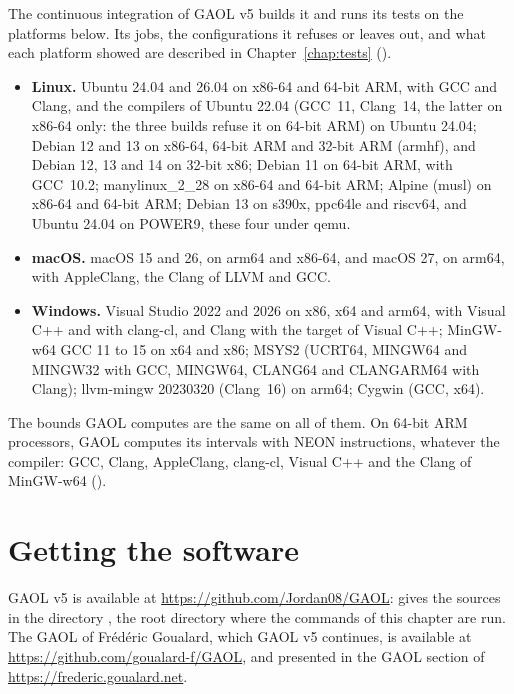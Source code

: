The continuous integration of GAOL v5 builds it and runs its tests on the
platforms below. Its jobs, the configurations it refuses or leaves out, and
what each platform showed are described in Chapter~\ref{chap:tests}
().

\begin{itemize}
\item[$\bullet$] \textbf{Linux.} Ubuntu 24.04 and 26.04 on x86-64 and
  64-bit ARM, with GCC and Clang, and the compilers of Ubuntu 22.04 (GCC~11, Clang~14, the latter on x86-64
  only: the three builds refuse it on 64-bit ARM) on Ubuntu 24.04; Debian 12 and 13 on x86-64,
  64-bit ARM and 32-bit ARM (armhf), and Debian 12, 13 and 14 on 32-bit x86;
  Debian 11 on 64-bit ARM, with GCC~10.2;
  manylinux\_2\_28 on x86-64 and 64-bit ARM; Alpine (musl) on x86-64 and 64-bit
  ARM; Debian 13 on s390x, ppc64le and riscv64, and Ubuntu 24.04 on POWER9,
  these four under qemu.
\item[$\bullet$] \textbf{macOS.} macOS 15 and 26, on arm64 and x86-64, and
  macOS 27, on arm64, with AppleClang, the Clang of LLVM and GCC.
\item[$\bullet$] \textbf{Windows.} Visual Studio 2022 and 2026 on x86, x64 and
  arm64, with Visual C++ and with clang-cl, and Clang with the target of
  Visual C++; MinGW-w64 GCC 11 to 15 on x64 and x86; MSYS2 (UCRT64, MINGW64
  and MINGW32 with GCC, MINGW64, CLANG64 and CLANGARM64 with Clang);
  llvm-mingw 20230320 (Clang~16) on arm64; Cygwin (GCC, x64).
\end{itemize}

\noindent
The bounds GAOL computes are the same on all of them. On 64-bit ARM
processors, GAOL computes its intervals with NEON instructions, whatever the
compiler: GCC, Clang, AppleClang, clang-cl, Visual C++ and the Clang of
MinGW-w64 ().\newinvfive

\section{Getting the software}
%

GAOL v5 is available at \url{https://github.com/Jordan08/GAOL}:
 gives the sources in the
directory , the root directory where the commands of this chapter are
run. The GAOL of
Fr\'ed\'eric Goualard, which GAOL v5 continues, is available at
\url{https://github.com/goualard-f/GAOL}, and presented in the GAOL section of
\url{https://frederic.goualard.net}.

